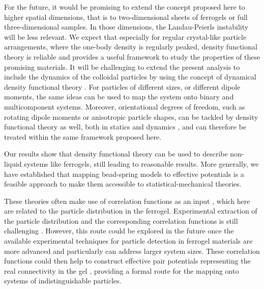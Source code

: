 \documentclass[aps,pre,twocolumn,superscriptaddress,nofootinbib]{revtex4}
\begin{document}
For the future, it would be promising to extend the concept proposed here to higher spatial dimensions, that is to two-dimensional sheets of ferrogels or full three-dimensional samples. 
In those dimensions, the Landau-Peierls instability will be less relevant. 
We expect that especially for regular crystal-like particle arrangements, where the one-body density is regularly peaked, density functional theory is reliable and provides a useful framework to study the properties of these promising materials.
It will be challenging to extend the present analysis to include the dynamics of the colloidal particles by using the concept of dynamical density functional theory
\cite{Archer2004_JChemPhys,Marconi1999_JChemPhys,Espanol2009_JChemPhys,Loewen2017_incollection}. 
For particles of different sizes, or different dipole moments, the same ideas can be used to map the system onto binary and multicomponent systems.
Moreover, orientational degrees of freedom, such as rotating dipole moments or anisotropic particle shapes, can be tackled by density functional theory as well, both in statics \cite{Groh1996_PhysRevE,Klapp2000_JChemPhys} and dynamics \cite{Rex2007_PhysRevE,Menzel2016_JChemPhys}, and can therefore be treated within the same framework proposed here. 

Our results show that density functional theory can be used to describe non-liquid systems like ferrogels, still leading to reasonable results. 
More generally, we have established that mapping bead-spring models to effective potentials is a feasible approach to make them accessible to statistical-mechanical theories. 

These theories often make use of correlation functions as an input \cite{Denton1991_PhysRevA}, which here are related to the particle distribution in the ferrogel. 
Experimental extraction of the particle distribution and the corresponding correlation functions is still challenging \cite{Gundermann2017_SmartMaterStruct}. 
However, this route could be explored in the future once the available experimental techniques for particle detection in ferrogel materials are more advanced and particularly can address larger system sizes. 
These correlation functions could then help to construct effective pair potentials representing the real connectivity in the gel \cite{Hansen-Goos2006_EurophysLett}, providing a formal route for the mapping onto systems of indistinguishable particles. 

\appendix*
\end{document}
